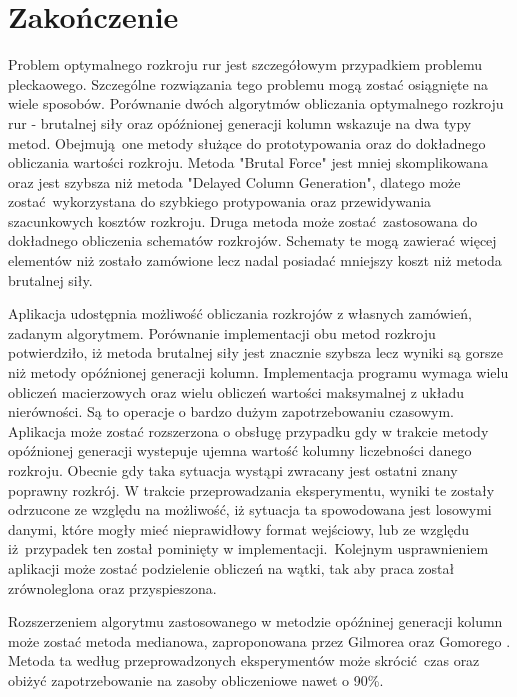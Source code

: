 \section{Zakończenie}
Problem optymalnego rozkroju rur jest szczegółowym przypadkiem problemu pleckaowego. Szczególne rozwiązania tego problemu mogą zostać osiągnięte na wiele sposobów. Porównanie dwóch algorytmów obliczania optymalnego rozkroju rur - brutalnej siły oraz opóźnionej generacji kolumn wskazuje na dwa typy metod. Obejmują one metody służące do prototypowania oraz do dokładnego obliczania wartości rozkroju. Metoda "Brutal Force" jest mniej skomplikowana oraz jest szybsza niż metoda "Delayed Column Generation", dlatego może zostać wykorzystana do szybkiego protypowania oraz przewidywania szacunkowych kosztów rozkroju. Druga metoda może zostać zastosowana do dokładnego obliczenia schematów rozkrojów. Schematy te mogą zawierać więcej elementów niż zostało zamówione lecz nadal posiadać mniejszy koszt niż metoda brutalnej siły.

Aplikacja udostępnia możliwość obliczania rozkrojów z własnych zamówień, zadanym algorytmem. Porównanie implementacji obu metod rozkroju potwierdziło, iż metoda brutalnej siły jest znacznie szybsza lecz wyniki są gorsze niż metody opóźnionej generacji kolumn. Implementacja programu wymaga wielu obliczeń macierzowych oraz wielu obliczeń wartości maksymalnej z układu nierówności. Są to operacje o bardzo dużym zapotrzebowaniu czasowym. Aplikacja może zostać rozszerzona o obsługę przypadku gdy w trakcie metody opóźnionej generacji wystepuje ujemna wartość kolumny liczebności danego rozkroju. Obecnie gdy taka sytuacja wystąpi zwracany jest ostatni znany poprawny rozkrój. W trakcie przeprowadzania eksperymentu, wyniki te zostały odrzucone ze względu na możliwość, iż sytuacja ta spowodowana jest losowymi danymi, które mogły mieć nieprawidłowy format wejściowy, lub ze względu iż przypadek ten został pominięty w implementacji. Kolejnym usprawnieniem aplikacji może zostać podzielenie obliczeń na wątki, tak aby praca został zrównoleglona oraz przyspieszona.

Rozszerzeniem algorytmu zastosowanego w metodzie opóźninej generacji kolumn może zostać metoda medianowa, zaproponowana przez Gilmorea oraz Gomorego \cite{GilmoreGomoryV2Article}. Metoda ta według przeprowadzonych eksperymentów może skrócić czas oraz obiżyć zapotrzebowanie na zasoby obliczeniowe nawet o 90\%.
